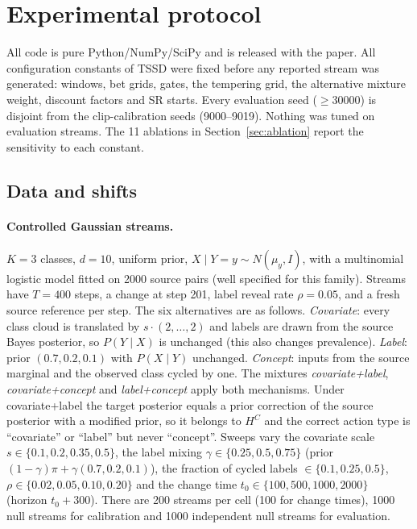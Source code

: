 \section{Experimental protocol}
\label{sec:protocol}

All code is pure Python/NumPy/SciPy and is released with the paper. All configuration constants of TSSD were fixed before any reported stream was generated: windows, bet grids, gates, the tempering grid, the alternative mixture weight, discount factors and SR starts. Every evaluation seed ($\ge30000$) is disjoint from the clip-calibration seeds (9000--9019). Nothing was tuned on evaluation streams. The 11 ablations in Section~\ref{sec:ablation} report the sensitivity to each constant.

\subsection{Data and shifts}
\paragraph{Controlled Gaussian streams.} $K=3$ classes, $d=10$, uniform prior, $X\mid Y=y\sim N(\mu_y,I)$, with a multinomial logistic model fitted on 2000 source pairs (well specified for this family). Streams have $T=400$ steps, a change at step 201, label reveal rate $\rho=0.05$, and a fresh source reference per step. The six alternatives are as follows. \emph{Covariate}: every class cloud is translated by $s\cdot(2,\dots,2)$ and labels are drawn from the source Bayes posterior, so $P(Y\mid X)$ is unchanged (this also changes prevalence). \emph{Label}: prior $(0.7,0.2,0.1)$ with $P(X\mid Y)$ unchanged. \emph{Concept}: inputs from the source marginal and the observed class cycled by one. The mixtures \emph{covariate+label}, \emph{covariate+concept} and \emph{label+concept} apply both mechanisms. Under covariate+label the target posterior equals a prior correction of the source posterior with a modified prior, so it belongs to $H^C$ and the correct action type is ``covariate'' or ``label'' but never ``concept''. Sweeps vary the covariate scale $s\in\{0.1,0.2,0.35,0.5\}$, the label mixing $\gamma\in\{0.25,0.5,0.75\}$ (prior $(1-\gamma)\pi+\gamma(0.7,0.2,0.1)$), the fraction of cycled labels $\in\{0.1,0.25,0.5\}$, $\rho\in\{0.02,0.05,0.10,0.20\}$ and the change time $t_0\in\{100,500,1000,2000\}$ (horizon $t_0+300$). There are 200 streams per cell (100 for change times), 1000 null streams for calibration and 1000 independent null streams for evaluation.

